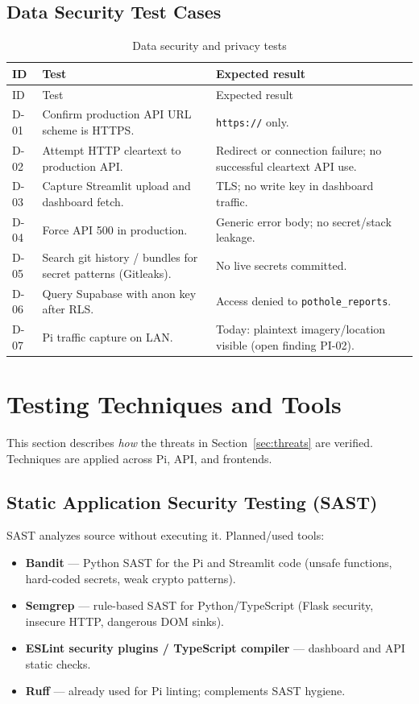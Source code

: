 \documentclass[12pt]{article}
\newcommand{\toprule}{\hline}
\newcommand{\midrule}{\hline}
\newcommand{\bottomrule}{\hline}
\begin{document}
\subsection{Data Security Test Cases}

\begin{longtable}{p{}p{}p{}}
\caption{Data security and privacy tests}\label{tab:data-tests}\\
\toprule
ID & Test & Expected result \\
\midrule
\endfirsthead
\toprule
ID & Test & Expected result \\
\midrule
\endhead
D-01 & Confirm production API URL scheme is HTTPS. & \texttt{https://} only. \\
D-02 & Attempt HTTP cleartext to production API. & Redirect or connection failure; no successful cleartext API use. \\
D-03 & Capture Streamlit upload and dashboard fetch. & TLS; no write key in dashboard traffic. \\
D-04 & Force API 500 in production. & Generic error body; no secret/stack leakage. \\
D-05 & Search git history / bundles for secret patterns (Gitleaks). & No live secrets committed. \\
D-06 & Query Supabase with anon key after RLS. & Access denied to \texttt{pothole\_reports}. \\
D-07 & Pi traffic capture on LAN. & Today: plaintext imagery/location visible (open finding PI-02). \\
\bottomrule
\end{longtable}

\section{Testing Techniques and Tools}
\label{sec:testing}

This section describes \emph{how} the threats in Section~\ref{sec:threats} are
verified. Techniques are applied across Pi, API, and frontends.

\subsection{Static Application Security Testing (SAST)}

SAST analyzes source without executing it. Planned/used tools:

\begin{itemize}
    \item \textbf{Bandit} --- Python SAST for the Pi and Streamlit code (unsafe
          functions, hard-coded secrets, weak crypto patterns).
    \item \textbf{Semgrep} --- rule-based SAST for Python/TypeScript (Flask
          security, insecure HTTP, dangerous DOM sinks).
    \item \textbf{ESLint security plugins / TypeScript compiler} --- dashboard
          and API static checks.
    \item \textbf{Ruff} --- already used for Pi linting; complements SAST hygiene.
\end{itemize}
\end{document}

